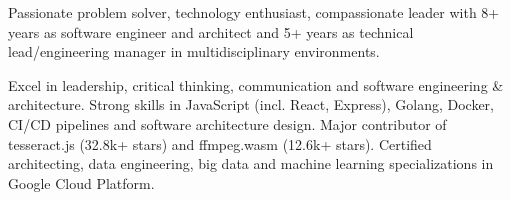 

\begin{cvparagraph}

Passionate problem solver, technology enthusiast, compassionate leader with 8+ years as software engineer and architect and 5+ years as technical lead/engineering manager in multidisciplinary environments.

Excel in leadership, critical thinking, communication and software engineering \& architecture. Strong skills in JavaScript (incl. React, Express), Golang, Docker, CI/CD pipelines and software architecture design. Major contributor of tesseract.js (32.8k+ stars) and ffmpeg.wasm (12.6k+ stars). Certified architecting, data engineering, big data and machine learning specializations in Google Cloud Platform.
\end{cvparagraph}
